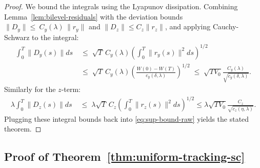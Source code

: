 \documentclass{article}
\newcommand{\1}{\mathbf{1}}
\begin{document}
\begin{proof}
    We bound the integrals using the Lyapunov dissipation. 
    Combining Lemma~\ref{lem:bilevel-residuals} with the deviation bounds $\|D_y\| \le \ C_y(\lambda)\,\|r_y\|$ and $\|D_z\| \le C_z \|r_z\|$, and applying Cauchy-Schwarz to the integral:
    \begin{align*}
        \int_0^T \|D_y(s)\| ds
        \;&\le\; \sqrt{T} \, C_y(\lambda) \left( \int_0^T \|r_y(s)\|^2 ds \right)^{1/2} \\
        \;&\le\; \sqrt{T} \, C_y(\lambda) \left( \frac{W(0) - W(T)}{c_y(\delta,\lambda)} \right)^{1/2}
        \;\le\; \sqrt{T V_0} \frac{C_y(\lambda)}{\sqrt{c_y(\delta,\lambda)}}.
    \end{align*}
    Similarly for the $z$-term:
    \begin{align*}
        \lambda \int_0^T \|D_z(s)\| ds
        \;&\le\; \lambda \sqrt{T} \, C_z \left( \int_0^T \|r_z(s)\|^2 ds \right)^{1/2} \leq  \lambda \sqrt{T V_0} \frac{C_z}{\sqrt{c_z(\eta,\lambda)}}.
    \end{align*}
    Plugging these integral bounds back into \eqref{eq:sup-bound-raw} yields the stated theorem.
\end{proof}


\subsection{Proof of Theorem~\ref{thm:uniform-tracking-sc}}
\end{document}
